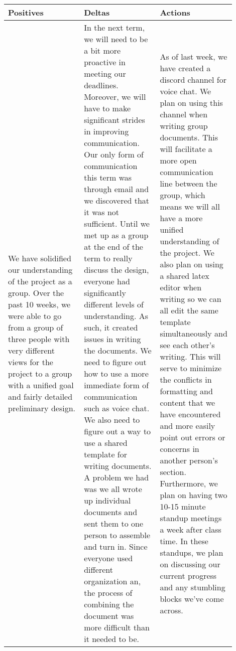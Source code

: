 \documentclass[onecolumn, draftclsnofoot,10pt, compsoc]{IEEEtran}
\begin{document}
	\begin{tabular*}{\linewidth}{@{\extracolsep{\fill}} p{0.3\linewidth}| p{0.3\linewidth}| p{0.3\linewidth}@{}}
		
		\centering Positives & \centering Deltas & \centering Actions \tabularnewline 
		\hline 
		We have solidified our understanding of the project as a group. Over the past 10 weeks, we were able to go from a group of three people with very different views for the project to a group with a unified goal and fairly detailed preliminary design. & In the next term, we will need to be a bit more proactive in meeting our deadlines. Moreover, we will have to make significant strides in improving communication. Our only form of communication this term was through email and we discovered that it was not sufficient. Until we met up as a group at the end of the term to really discuss the design, everyone had significantly different levels of understanding. As such, it created issues in writing the documents. We need to figure out how to use a more immediate form of communication such as voice chat. We also need to figure out a way to use a shared template for writing documents. A problem we had was we all wrote up individual documents and sent them to one person to assemble and turn in. Since everyone used different organization an, the process of combining the document was more difficult than it needed to be. & As of last week, we have created a discord channel for voice chat. We plan on using this channel when writing group documents. This will facilitate a more open communication line between the group, which means we will all have a more unified understanding of the project. We also plan on using a shared latex editor when writing so we can all edit the same template simultaneously and see each other's writing. This will serve to minimize the conflicts in formatting and content that we have encountered and more easily point out errors or concerns in another person's section. Furthermore, we plan on having two 10-15 minute standup meetings a week after class time. In these standups, we plan on discussing our current progress and any stumbling blocks we've come across. 
		
	\end{tabular*}
	
	
	
\end{document}
